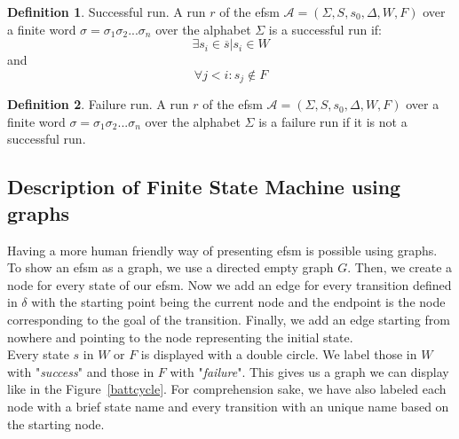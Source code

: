 \documentclass[12pt]{article}
\theoremstyle{definition}
\newtheorem{definition}{Definition}[section]
\theoremstyle{definition}
\theoremstyle{remark}
\newcommand{\A}{\mathcal{A}}
\begin{document}
\theoremstyle{definition}
\begin{definition}{Successful run.} A run $r$ of the \gls{efsm} $\A = (\Sigma, S, s_{0}, \Delta, W, F)$ over a finite word $\sigma = \sigma_1 \sigma_2 ... \sigma_n$ over the alphabet $\Sigma$ is a successful run if:
$$\exists s_i \in \overline{s} | s_{i} \in W$$ and $$\forall j < i: s_{j} \notin F$$
\end{definition}

\theoremstyle{definition}
\begin{definition}{Failure run.} A run $r$ of the \gls{efsm} $\A = (\Sigma, S, s_{0}, \Delta, W, F)$ over a finite word $\sigma = \sigma_1 \sigma_2 ... \sigma_n$ over the alphabet $\Sigma$ is a failure run if it is not a successful run.
\end{definition}



\subsection{Description of Finite State Machine using graphs}

Having a more human friendly way of presenting \gls{efsm} is possible using graphs. To show an \gls{efsm} as a graph, we use a directed empty graph $G$. Then, we create a node for every state of our \gls{efsm}. Now we add an edge for every transition defined in $\delta$ with the starting point being the current node and the endpoint is the node corresponding to the goal of the transition. Finally, we add an edge starting from nowhere and pointing to the node representing the initial state.\\

Every state $s$ in $W$ or $F$ is displayed with a double circle. We label those in $W$ with "\textit{success}" and those in $F$ with "\textit{failure}". This gives us a graph we can display like in the Figure~\ref{battcycle}. For comprehension sake, we have also labeled each node with a brief state name and every transition with an unique name based on the starting node.


\end{document}
